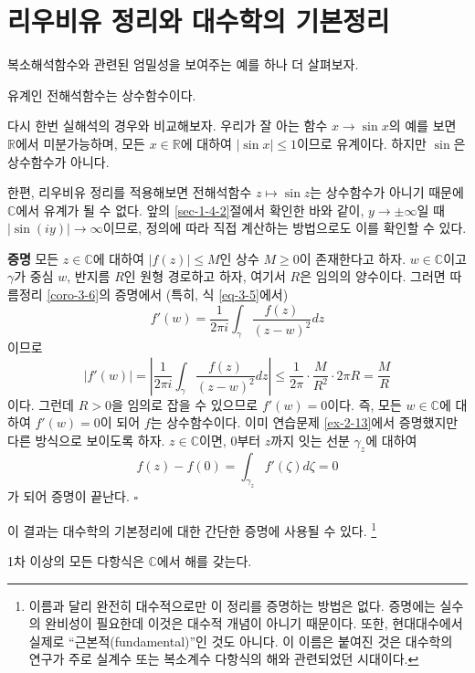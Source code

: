 \section{리우비유 정리와 대수학의 기본정리}

복소해석함수와 관련된 엄밀성을 보여주는 예를 하나 더 살펴보자.

\begin{salttheorem}{}{} \label{thm-3-7}
유계인 전해석함수는 상수함수이다.
\end{salttheorem}

다시 한번 실해석의 경우와 비교해보자.
우리가 잘 아는 함수 $x\to \sin x$의 예를 보면
$\mathbb R$에서 미분가능하며,
모든 $x\in\mathbb R$에 대하여 $|\sin x|\le 1$이므로 
유계이다.
하지만 $\sin$은 상수함수가 아니다.

한편, 리우비유 정리를 적용해보면
전해석함수 $z\mapsto \sin z$는 상수함수가 아니기 때문에
$\mathbb C$에서 유계가 될 수 없다.
앞의 \ref{sec-1-4-2}절에서 확인한 바와 같이,
$y\to\pm\infty$일 때 $|\sin(iy)| \to \infty$이므로,
정의에 따라 직접 계산하는 방법으로도 이를 확인할 수 있다.

{\bf 증명}
모든 $z\in \mathbb C$에 대하여 $|f(z)|\le M$인
상수 $M\ge0$이 존재한다고 하자.
$w\in\mathbb C$이고 $\gamma$가 중심 $w$, 반지름 $R$인 원형 경로하고 하자, 
여기서 $R$은 임의의 양수이다.
그러면 따름정리 \ref{coro-3-6}의 증명에서 (특히, 식 \eqref{eq-3-5}에서)
\[
f'(w) = \dfrac1{2\pi i} \int_\gamma \dfrac{f(z)}{(z-w)^2}dz
\]
이므로
\[
|f'(w)| = \left| \dfrac1{2\pi i} \int_\gamma \dfrac{f(z)}{(z-w)^2}dz \right|
\le \dfrac1{2\pi}\cdot \dfrac M{R^2}\cdot 2\pi R = \dfrac MR
\]
이다.
그런데 $R>0$을 임의로 잡을 수 있으므로 $f'(w)=0$이다.
즉, 모든 $w\in\mathbb C$에 대하여 $f'(w)=0$이 되어 $f$는 상수함수이다.
이미 연습문제 \ref{ex-2-13}에서 증명했지만 다른 방식으로 보이도록 하자.
$z\in\mathbb C$이면, $0$부터 $z$까지 잇는 선분 $\gamma_z$에 대하여
\[
f(z) - f(0) = \int_{\gamma_z} f'(\zeta)d\zeta = 0
\]
가 되어 증명이 끝난다.
\hfill $\square$

이 결과는 대수학의 기본정리에 대한 간단한 증명에 사용될 수 있다.
\footnote{
이름과 달리 완전히 대수적으로만 이 정리를 증명하는 방법은 없다.
증명에는 실수의 완비성이 필요한데 이것은 대수적 개념이 아니기 때문이다.
또한, 현대대수에서 실제로 ``근본적(fundamental)''인 것도 아니다.
이 이름은 붙여진 것은 대수학의 연구가 주로 실계수 또는 복소계수 다항식의 해와 관련되었던
시대이다.}

\begin{salt_corollary}  \label{coro-3-7}
1차 이상의 모든 다항식은 $\mathbb C$에서 해를 갖는다.
\end{salt_corollary}

